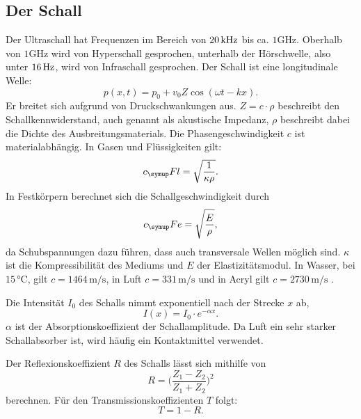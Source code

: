 \subsection{Der Schall}
Der Ultraschall hat Frequenzen im Bereich von $20 \,\si{\kilo\hertz}$ bis ca. $1 \si{\giga\hertz}$.
Oberhalb von $1 \si{\giga\hertz}$ wird von Hyperschall gesprochen, unterhalb der Hörschwelle,
also unter $16 \,\si{\hertz}$, wird von Infraschall gesprochen.
Der Schall ist eine longitudinale Welle:
\begin{equation}
  p(x,t)= p_0 + v_0 Z \cos{(\omega t -kx)}.
\end{equation}
Er breitet sich aufgrund von Druckschwankungen aus. $Z= c \cdot \rho$ beschreibt
den Schallkennwiderstand, auch genannt als akustische Impedanz, $\rho$ beschreibt
dabei die Dichte des Ausbreitungsmaterials. Die Phasengeschwindigkeit $c$ ist
materialabhängig. In Gasen und Flüssigkeiten gilt:
\begin{equation}
  c_\su{Fl} = \sqrt{\frac{1}{\kappa \rho}}.
\end{equation}
In Festkörpern berechnet sich die Schallgeschwindigkeit durch
\begin{equation}
  c_\su{Fe}= \sqrt{\frac{E}{\rho}},
\end{equation}
da Schubspannungen dazu führen, dass auch transversale Wellen möglich sind.
$\kappa$ ist die Kompressibilität des Mediums und $E$ der Elastizitätsmodul.
In Wasser, bei $15 \,\si{\celsius}$, gilt $c = 1464 \,\si{\meter\per\second}$,
in Luft $c = 331 \,\si{\meter\per\second}$ \cite{spektrum} und in Acryl
gilt $c = 2730 \,\si{\meter\per\second}$ \cite{olympus}.

\noindent Die Intensität $I_0$ des Schalls nimmt exponentiell nach der Strecke $x$ ab,
\begin{equation}
  I(x) = I_0 \cdot e^{-\alpha x}.
\end{equation}
$\alpha$ ist der Absorptionskoeffizient der Schallamplitude. Da Luft ein sehr
starker Schallabsorber ist, wird häufig ein Kontaktmittel verwendet.

\noindent Der Reflexionskoeffizient $R$ des Schalls lässt sich mithilfe von
\begin{equation}
  R = \Bigg(\frac{Z_1 - Z_2}{Z_1 + Z_2}\Bigg)^2
\end{equation}
berechnen. Für den Transmissionskoeffizienten $T$ folgt:
\begin{equation}
  T = 1-R.
\end{equation}

